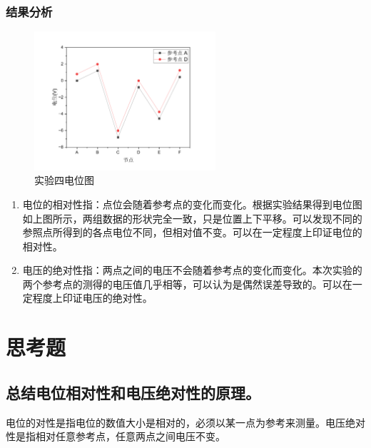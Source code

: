 \documentclass[a4paper,utf8]{article}
\begin{document}
\subsubsection{结果分析}
\begin{figure}[!ht]
    \caption{实验四电位图}
    \includegraphics[width=0.6\textwidth]{exp4fig.pdf}
\end{figure}
\begin{enumerate}
    \item 电位的相对性指：点位会随着参考点的变化而变化。根据实验结果得到电位图如上图所示，两组数据的形状完全一致，只是位置上下平移。可以发现不同的参照点所得到的各点电位不同，但相对值不变。可以在一定程度上印证电位的相对性。
    \item  电压的绝对性指：两点之间的电压不会随着参考点的变化而变化。本次实验的两个参考点的测得的电压值几乎相等，可以认为是偶然误差导致的。可以在一定程度上印证电压的绝对性。
\end{enumerate}
\section{思考题}
\subsection{总结电位相对性和电压绝对性的原理。}
电位的对性是指电位的数值大小是相对的，必须以某一点为参考来测量。电压绝对性是指相对任意参考点，任意两点之间电压不变。
\end{document}
